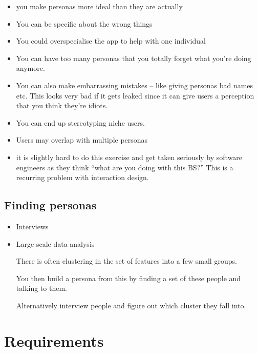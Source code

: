 \documentclass[10pt, a4paper]{article}
\begin{document}
\begin{itemize}
\begin{itemize}
\item you make personas more ideal than they are actually

\item You can be specific about the wrong things

\item You could overspecialise the app to help with one individual

\item You can have too many personas that you totally forget what you're doing anymore.

\item You can also make embarrassing mistakes -- like giving personas bad names etc. This looks very bad if it gets
leaked since it can give users a perception that you think they're idiots.

\item You can end up stereotyping niche users.

\item Users may overlap with multiple personas

\item it is slightly hard to do this exercise and get taken seriously by software engineers as they think ``what are
you doing with this BS?'' This is a recurring problem with interaction design.

\end{itemize}

\subsection{Finding personas}

\begin{itemize}

\item Interviews

\item Large scale data analysis

There is often clustering in the set of features into a few small groups.

You then build a persona from this by finding a set of these people and talking to them.

Alternatively interview people and figure out which cluster they fall into.

\end{itemize}

\end{itemize}

\section{Requirements}
\end{document}
